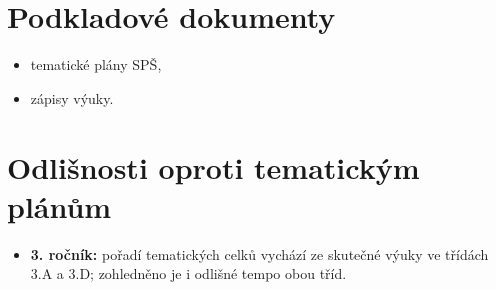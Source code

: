 \documentclass[10pt,a4paper]{article}
\begin{document}
\section*{Podkladové dokumenty}
\begin{itemize}\setlength{\itemsep}{2pt}
\item tematické plány SP\v{S},
\item zápisy výuky.
\end{itemize}

\section*{Odlišnosti oproti tematickým plánům}
\begin{itemize}\setlength{\itemsep}{2pt}
\item \textbf{3. ročník:} pořadí tematických celků vychází ze skutečné výuky ve třídách 3.A a 3.D; zohledněno je i odlišné tempo obou tříd.
\end{itemize}
\clearpage
\end{document}
